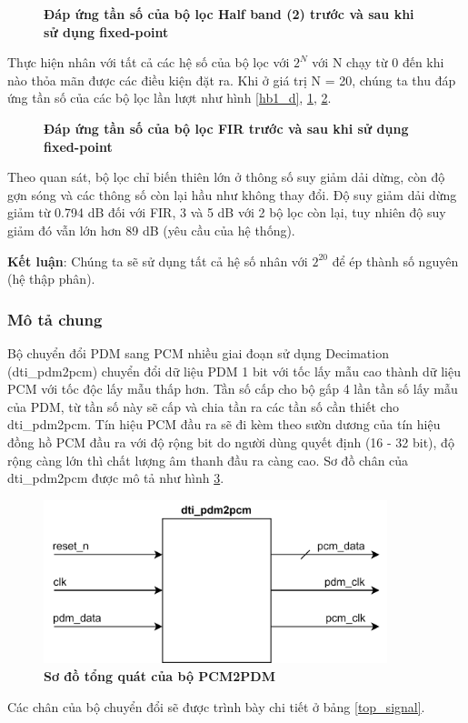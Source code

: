 \begin{figure}[H]
    \centering
    
    \caption[Đáp ứng tần số của bộ lọc Half band (2) trước và sau khi sử dụng fixed-point]{\bfseries \fontsize{12pt}{0pt}\selectfont Đáp ứng tần số của bộ lọc Half band (2) trước và sau khi sử dụng fixed-point}
    \label{hb2_d}
\end{figure}
Thực hiện nhân với tất cả các hệ số của bộ lọc với $2^N$ với N chạy từ 0 đến khi nào thỏa mãn được các điều kiện đặt ra. Khi ở giá trị N = 20, chúng ta thu đáp ứng tần số của các bộ lọc lần lượt như hình \ref{hb1_d}, \ref{hb2_d}, \ref{fir_d}.
\begin{figure}[H]
    \centering
    
    \caption[Đáp ứng tần số của bộ lọc FIR trước và sau khi sử dụng fixed-point]{\bfseries \fontsize{12pt}{0pt}\selectfont Đáp ứng tần số của bộ lọc FIR trước và sau khi sử dụng fixed-point}
    \label{fir_d}
\end{figure}
Theo quan sát, bộ lọc chỉ biến thiên lớn ở thông số suy giảm dải dừng, còn độ gợn sóng và các thông số còn lại hầu như không thay đổi. Độ suy giảm dải dừng giảm từ 0.794 dB đối với FIR, 3 và 5 dB với 2 bộ lọc còn lại, tuy nhiên độ suy giảm đó vẫn lớn hơn 89 dB (yêu cầu của hệ thống).

\textbf{Kết luận}: Chúng ta sẽ sử dụng tất cả hệ số nhân với $2^{20}$ để ép thành số nguyên (hệ thập phân).
\subsubsection{Mô tả chung}
Bộ chuyển đổi PDM sang PCM nhiều giai đoạn sử dụng Decimation (dti\_pdm2pcm) chuyển đổi dữ liệu PDM 1 bit với tốc lấy mẫu cao thành dữ liệu PCM với  tốc độc lấy mẫu thấp hơn. Tần số cấp cho bộ gấp 4 lần tần số lấy mẫu của PDM, từ tần số này sẽ cấp và chia tần ra các tần số cần thiết cho dti\_pdm2pcm. Tín hiệu PCM đầu ra sẽ đi kèm theo sườn dương của tín hiệu đồng hồ PCM đầu ra với độ rộng bit do người dùng quyết định (16 - 32 bit), độ rộng càng lớn thì chất lượng âm thanh đầu ra càng cao. Sơ đồ chân của dti\_pdm2pcm được mô tả như hình \ref{top_pdm2pcm}.

\begin{figure}[H]
    \centering
    \includegraphics[width=10cm]{Images/Chuong4/top.png}
    \caption[Sơ đồ tổng quát của bộ PCM2PDM]{\bfseries \fontsize{12pt}{0pt}\selectfont Sơ đồ tổng quát của bộ PCM2PDM}
    \label{top_pdm2pcm}
\end{figure}
Các chân của bộ chuyển đổi sẽ được trình bày chi tiết ở bảng \ref{top_signal}.

